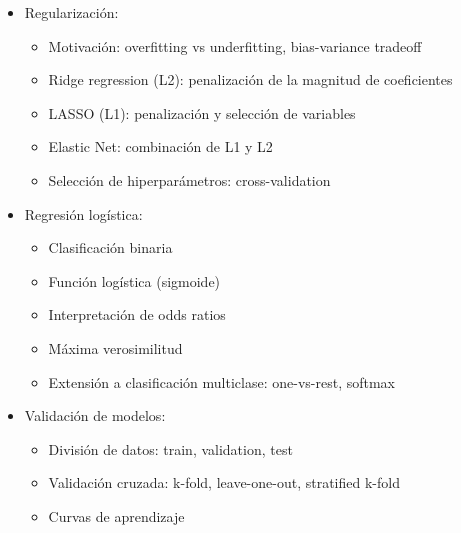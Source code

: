\documentclass[a4paper,11pt]{article}
\begin{document}
\begin{itemize}[leftmargin=*]
\begin{itemize}
        \item Análisis de residuos: gráficos diagnósticos
        \item Tests de hipótesis sobre coeficientes
        \item Intervalos de confianza y predicción
    \end{itemize}
    \item Regularización:
    \begin{itemize}
        \item Motivación: overfitting vs underfitting, bias-variance tradeoff
        \item Ridge regression (L2): penalización de la magnitud de coeficientes
        \item LASSO (L1): penalización y selección de variables
        \item Elastic Net: combinación de L1 y L2
        \item Selección de hiperparámetros: cross-validation
    \end{itemize}
    \item Regresión logística:
    \begin{itemize}
        \item Clasificación binaria
        \item Función logística (sigmoide)
        \item Interpretación de odds ratios
        \item Máxima verosimilitud
        \item Extensión a clasificación multiclase: one-vs-rest, softmax
    \end{itemize}
    \item Validación de modelos:
    \begin{itemize}
        \item División de datos: train, validation, test
        \item Validación cruzada: k-fold, leave-one-out, stratified k-fold
        \item Curvas de aprendizaje
    \end{itemize}
\end{itemize}
\end{document}
